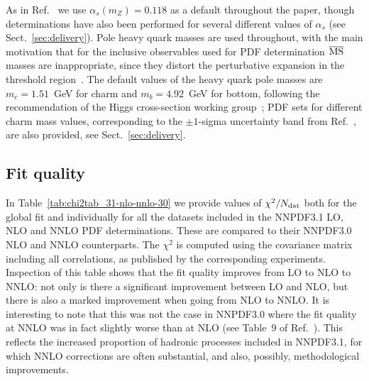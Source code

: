 As in Ref.~\cite{Ball:2014uwa} we use $\alpha_s(m_Z)=0.118$ as a
default throughout the paper, though determinations have also been
performed for several different values of
$\alpha_s$ (see Sect.~\ref{sec:delivery}).
Pole heavy quark masses are used throughout, with the main motivation
that for the inclusive observables used for PDF determination
$\overline{\rm MS}$ masses are inappropriate, since they distort the perturbative
expansion in the threshold region~\cite{Ball:2016qeg}. 
The default values of the heavy quark pole masses are  $m_c=1.51$~GeV for
  charm and $m_b=4.92$~GeV for bottom,
  following the recommendation of the Higgs cross-section working
  group~\cite{deFlorian:2016spz};
  PDF sets for different charm mass values, corresponding to
 the $\pm 1$-sigma uncertainty band from
  Ref.~\cite{deFlorian:2016spz}, are also provided, see
Sect.~\ref{sec:delivery}.


\subsection{Fit quality}
\label{sec:fquality}




In Table~\ref{tab:chi2tab_31-nlo-nnlo-30} we provide
values of $\chi^2/N_{\rm dat}$ both for the global fit and individually for all the datasets included in the
NNPDF3.1 LO, NLO
  and NNLO PDF determinations. These are compared to their NNPDF3.0 NLO and NNLO
  counterparts. The $\chi^2$
  is computed using the covariance matrix including all correlations,
  as published by the corresponding experiments.
 Inspection of this table
shows that the fit quality improves from LO to NLO to NNLO: not only
is there a significant improvement between LO and NLO, but there is also a marked improvement when going from NLO
to NNLO. It is interesting to note that this was not the case in
NNPDF3.0 where the fit quality at NNLO was in fact slightly worse than
at NLO (see Table~9 of Ref.~\cite{Ball:2014uwa}). This reflects the increased proportion of 
hadronic processes included in NNPDF3.1, for which NNLO corrections
are often substantial, and also, possibly, methodological improvements.

